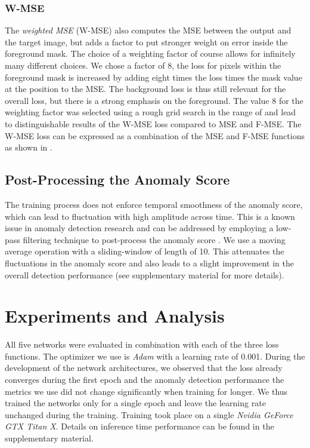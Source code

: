 \documentclass[10pt,twocolumn,letterpaper]{article}
\begin{document}
\subsubsection{W-MSE}
The \emph{weighted MSE} (W-MSE) also computes the MSE between the output and the target image, but adds a factor to put stronger weight on error inside the foreground mask. The choice of a weighting factor of course allows for infinitely many different choices. We chose a factor of \num{8}, \ie the loss for pixels within the foreground mask is increased by adding eight times the loss times the mask value at the position to the MSE. The background loss is thus still relevant for the overall loss, but there is a strong emphasis on the foreground. The value \num{8} for the weighting factor was selected using a rough grid search in the range of  and lead to distinguishable results of the W-MSE loss compared to MSE and F-MSE. The W-MSE loss can be expressed as a combination of the MSE and F-MSE functions as shown in .



\subsection{Post-Processing the Anomaly Score} \label{sec:post_proc}
The training process does not enforce temporal smoothness of the anomaly score, which can lead to fluctuation with high amplitude across time. This is a known issue in anomaly detection research and can be addressed by employing a low-pass filtering technique to post-process the anomaly score \cite{driver_anomaly_dataset}. We use a moving average operation with a sliding-window of length of \num{10}. This attenuates the fluctuations in the anomaly score and also leads to a slight improvement in the overall detection performance (see supplementary material for more details).

\section{Experiments and Analysis} \label{sec:exp}
All five networks were evaluated in combination with each of the three loss functions. The optimizer we use is \emph{Adam} with a learning rate of \num{0.001}. During the development of the network architectures, we observed that the loss already converges during the first epoch and the anomaly detection performance \wrt the metrics we use did not change significantly when training for longer. We thus trained the networks only for a single epoch and leave the learning rate unchanged during the training. Training took place on a single \emph{Nvidia GeForce GTX Titan X}. Details on inference time performance can be found in the supplementary material.
\end{document}
